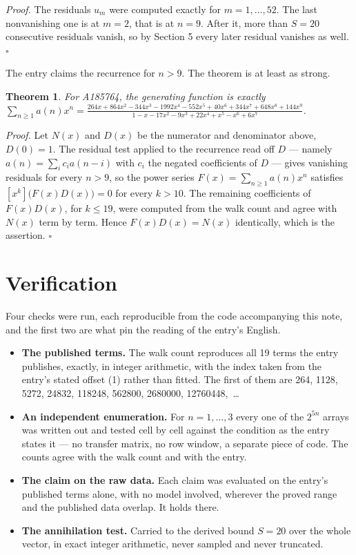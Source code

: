 \documentclass[11pt]{article}
\newtheorem{theorem}{Theorem}
\theoremstyle{definition}
\begin{document}
{\itshape Proof.} The residuals $u_m$ were computed exactly for $m = 1,\dots,52$. The last nonvanishing one is at $m = 2$, that is at $n = 9$. After it, more than $S = 20$ consecutive residuals vanish, so by Section 5 every later residual vanishes as well. $\square$

The entry claims the recurrence for $n > 9$. The theorem is at least as strong.

\begin{theorem} For A185764, the generating function is exactly $\sum_{n\ge 1} a(n)x^n = \frac{264x + 864x^{2} - 344x^{3} - 1992x^{4} - 552x^{5} + 40x^{6} + 344x^{7} + 648x^{8} + 144x^{9}}{1 - x - 17x^{2} - 9x^{3} + 22x^{4} + x^{5} - x^{6} + 6x^{7}}$.\end{theorem}

{\itshape Proof.} Let $N(x)$ and $D(x)$ be the numerator and denominator above, $D(0)=1$. The residual test applied to the recurrence read off $D$ --- namely $a(n) = \sum_i c_i a(n-i)$ with $c_i$ the negated coefficients of $D$ --- gives vanishing residuals for every $n > 9$, so the power series $F(x)=\sum_{n\ge 1}a(n)x^n$ satisfies $[x^k]\bigl(F(x)D(x)\bigr) = 0$ for every $k > 10$. The remaining coefficients of $F(x)D(x)$, for $k \le 19$, were computed from the walk count and agree with $N(x)$ term by term. Hence $F(x)D(x) = N(x)$ identically, which is the assertion. $\square$

\section{Verification}

Four checks were run, each reproducible from the code accompanying this note, and the first two are what pin the reading of the entry's English.

\begin{itemize}

\item {\bfseries The published terms.} The walk count reproduces all 19 terms the entry publishes, exactly, in integer arithmetic, with the index taken from the entry's stated offset (1) rather than fitted. The first of them are 264, 1128, 5272, 24832, 118248, 562800, 2680000, 12760448,~\dots

\item {\bfseries An independent enumeration.} For $n = 1,\dots,3$ every one of the $2^{5n}$ arrays was written out and tested cell by cell against the condition as the entry states it --- no transfer matrix, no row window, a separate piece of code. The counts agree with the walk count and with the entry.

\item {\bfseries The claim on the raw data.} Each claim was evaluated on the entry's published terms alone, with no model involved, wherever the proved range and the published data overlap. It holds there.

\item {\bfseries The annihilation test.} Carried to the derived bound $S = 20$ over the whole vector, in exact integer arithmetic, never sampled and never truncated.

\end{itemize}
\end{document}
